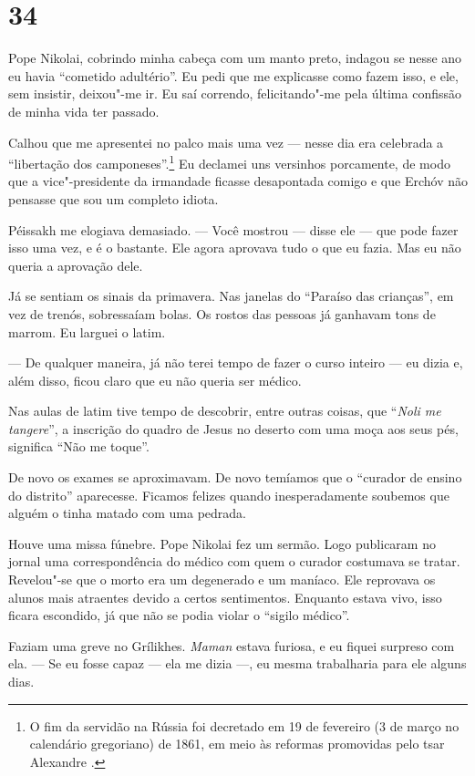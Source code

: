 \section{34}

Pope Nikolai, cobrindo minha cabeça com um manto preto, indagou se nesse
ano eu havia ``cometido adultério''. Eu pedi que me explicasse como
fazem isso, e ele, sem insistir, deixou"-me ir. Eu saí correndo,
felicitando"-me pela última confissão de minha vida ter passado.

Calhou que me apresentei no palco mais uma vez --- nesse dia era
celebrada a ``libertação dos camponeses''.\footnote{O fim da servidão na
  Rússia foi decretado em 19 de fevereiro (3 de março no calendário
  gregoriano) de 1861, em meio às reformas promovidas pelo tsar
  Alexandre \scalebox{.8}{II}.} Eu declamei uns versinhos porcamente, de modo que a
vice"-presidente da irmandade ficasse desapontada comigo e que Erchóv não
pensasse que sou um completo idiota.

Péissakh me elogiava demasiado. --- Você mostrou --- disse ele --- que
pode fazer isso uma vez, e é o bastante. Ele agora aprovava tudo o que
eu fazia. Mas eu não queria a aprovação dele.

Já se sentiam os sinais da primavera. Nas janelas do ``Paraíso das
crianças'', em vez de trenós, sobressaíam bolas. Os rostos das pessoas
já ganhavam tons de marrom. Eu larguei o latim.

--- De qualquer maneira, já não terei tempo de fazer o curso inteiro ---
eu dizia e, além disso, ficou claro que eu não queria ser médico.

Nas aulas de latim tive tempo de descobrir, entre outras coisas, que
``\emph{Noli me tangere}'', a inscrição do quadro de Jesus no deserto
com uma moça aos seus pés, significa ``Não me toque''.

De novo os exames se aproximavam. De novo temíamos que o ``curador de
ensino do distrito'' aparecesse. Ficamos felizes quando inesperadamente
soubemos que alguém o tinha matado com uma pedrada.

Houve uma missa fúnebre. Pope Nikolai fez um sermão. Logo publicaram no
jornal uma correspondência do médico com quem o curador costumava se
tratar. Revelou"-se que o morto era um degenerado e um maníaco. Ele
reprovava os alunos mais atraentes devido a certos sentimentos. Enquanto
estava vivo, isso ficara escondido, já que não se podia violar o
``sigilo médico''.

Faziam uma greve no Grílikhes. \emph{Maman} estava furiosa, e eu fiquei
surpreso com ela. --- Se eu fosse capaz --- ela me dizia ---, eu mesma
trabalharia para ele alguns dias.

